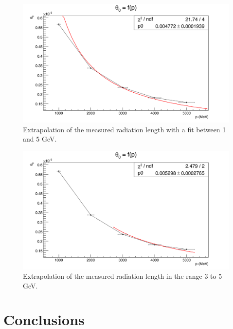    \begin{figure}
     \centering
     \includegraphics[width = \textwidth]{Pictures/X0/theta0VsP_all.png}
     \caption{Extrapolation of the measured radiation length with a fit between 1 and 5 GeV.}
     \label{fig:theta0vsP_all}
   \end{figure}
   \begin{figure}
     \centering
     \includegraphics[width = \textwidth]{Pictures/X0/theta0VsP_3-5GeV.png}
     \caption{Extrapolation of the measured radiation length in the range 3 to 5 GeV.}
     \label{fig:theta0vsP_3-5}
   \end{figure}

   \begin{figure}
     \centering
     \label{fig:X0vsP}
   \end{figure}


  \section{Conclusions}

